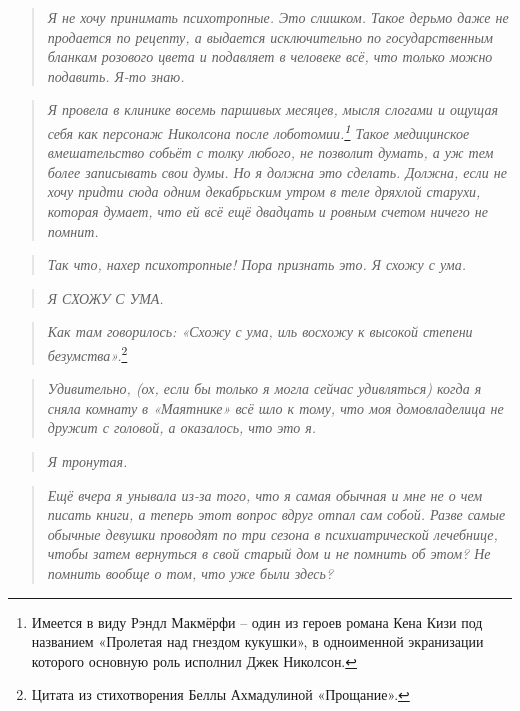 \documentclass[
  a5paperpaper,
  DIV=11,
  numbers=noendperiod]{scrreprt}
\begin{document}
\begin{quote}
\emph{Я не хочу принимать психотропные. Это слишком. Такое дерьмо даже
не продается по рецепту, а выдается исключительно по государственным
бланкам розового цвета и подавляет в человеке всё, что только можно
подавить. Я-то знаю. }
\end{quote}

\begin{quote}
\emph{Я провела в клинике восемь паршивых месяцев, мысля слогами и
ощущая себя как персонаж Николсона после лоботомии.\footnote{Имеется в
  виду Рэндл Макмёрфи -- один из героев романа Кена Кизи под названием
  «Пролетая над гнездом кукушки», в одноименной экранизации которого
  основную роль исполнил Джек Николсон.} Такое медицинское вмешательство
собьёт с толку любого, не позволит думать, а уж тем более записывать
свои думы. Но я должна это сделать. Должна, если не хочу придти сюда
одним декабрьским утром в теле дряхлой старухи, которая думает, что ей
всё ещё двадцать и ровным счетом ничего не помнит.}
\end{quote}

\begin{quote}
\emph{Так что, нахер психотропные! Пора признать это. Я схожу с ума.}
\end{quote}

\begin{quote}
\emph{Я СХОЖУ С УМА.}
\end{quote}

\begin{quote}
\emph{Как там говорилось: «Схожу с ума, иль восхожу к высокой степени
безумства».}\footnote{Цитата из стихотворения Беллы Ахмадулиной
  «Прощание».}
\end{quote}

\begin{quote}
\emph{Удивительно, (ох, если бы только я могла сейчас удивляться) когда
я сняла комнату в «Маятнике» всё шло к тому, что моя домовладелица не
дружит с головой, а оказалось, что это я.}
\end{quote}

\begin{quote}
\emph{Я тронутая.}
\end{quote}

\begin{quote}
\emph{Ещё вчера я унывала из-за того, что я самая обычная и мне не о чем
писать книги, а теперь этот вопрос вдруг отпал сам собой. Разве самые
обычные девушки проводят по три сезона в психиатрической лечебнице,
чтобы затем вернуться в свой старый дом и не помнить об этом? Не помнить
вообще о том, что уже были здесь?}
\end{quote}
\end{document}
